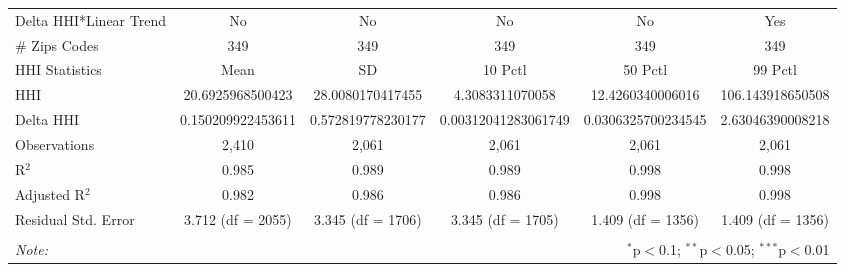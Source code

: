 \begin{table}[H]
{\begin{tabular}{@{\extracolsep{5pt}}lccccc}
 Delta HHI*Linear Trend & No & No & No & No & Yes \\  

 # Zips Codes & 349 & 349 & 349 & 349 & 349 \\  

 HHI Statistics & Mean & SD & 10 Pctl & 50 Pctl & 99 Pctl \\  

 HHI & 20.6925968500423 & 28.0080170417455 & 4.3083311070058 & 12.4260340006016 & 106.143918650508 \\  

 Delta HHI & 0.150209922453611 & 0.572819778230177 & 0.00312041283061749 & 0.0306325700234545 & 2.63046390008218 \\  

 Observations & 2,410 & 2,061 & 2,061 & 2,061 & 2,061 \\  

 R$^{2}$ & 0.985 & 0.989 & 0.989 & 0.998 & 0.998 \\  

 Adjusted R$^{2}$ & 0.982 & 0.986 & 0.986 & 0.998 & 0.998 \\  

 Residual Std. Error & 3.712 (df = 2055) & 3.345 (df = 1706) & 3.345 (df = 1705) & 1.409 (df = 1356) & 1.409 (df = 1356) \\  

 \hline  

 \hline \\[-1.8ex]  

 \textit{Note:}  & \multicolumn{5}{r}{$^{*}$p$<$0.1; $^{**}$p$<$0.05; $^{***}$p$<$0.01} \\  

 \end{tabular}}  

 \end{table}  

 




